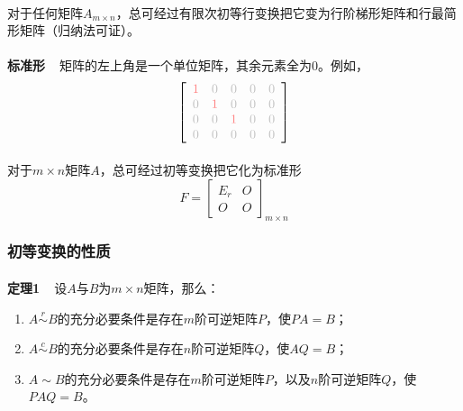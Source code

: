 \paragraph{}
对于任何矩阵$A_{m\times n}$，总可经过有限次初等行变换把它变为行阶梯形矩阵和行最简形矩阵（归纳法可证）。

\paragraph{}
\textbf{标准形~~}矩阵的左上角是一个单位矩阵，其余元素全为$0$。例如，
\begin{equation*}
  \left[{\color{gray!50} \begin{array}{ccccc}
    {\color{red!50}1} & 0 & 0 & 0 & 0 \\
    0 & {\color{red!50}1} & 0 & 0 & 0 \\
    0 & 0 & {\color{red!50}1} & 0 & 0 \\
    0 & 0 & 0 & 0 & 0
  \end{array}}\right]
\end{equation*}

\paragraph{}
对于$m\times n$矩阵$A$，总可经过初等变换把它化为标准形
\begin{equation*}
  F = \left[\begin{array}{cc}
    E_r & O \\
    O & O
  \end{array}\right]_{m\times n}
\end{equation*}

\subsubsection{初等变换的性质}\label{sec:初等变换的性质}
\paragraph{}
\textbf{定理1~~}设$A$与$B$为$m\times n$矩阵，那么：
\begin{enumerate}
  \item $A \overset{r}{\sim} B$的充分必要条件是存在$m$阶可逆矩阵$P$，使$PA = B$；
  \item $A \overset{c}{\sim} B$的充分必要条件是存在$n$阶可逆矩阵$Q$，使$AQ = B$；
  \item $A \sim B$的充分必要条件是存在$m$阶可逆矩阵$P$，以及$n$阶可逆矩阵$Q$，使$PAQ = B$。
\end{enumerate}

